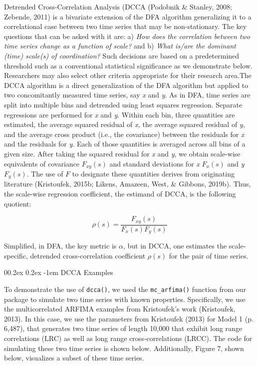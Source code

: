 \documentclass[
  man]{apa6}
\makeatletter
\let\oldparagraph\paragraph
\renewcommand{\paragraph}[1]{\oldparagraph{#1}\mbox{}}
\renewcommand{\paragraph}{\@startsection{paragraph}{4}{\parindent}%
  {0\baselineskip \@plus 0.2ex \@minus 0.2ex}%
  {-1em}%
  {\normalfont\normalsize\bfseries\itshape\typesectitle}}
\makeatother
\begin{document}
Detrended Cross-Correlation Analysis (DCCA
(Podobnik \& Stanley, 2008; Zebende, 2011) is a bivariate extension of
the DFA algorithm generalizing it to a correlational case between two
time series that may be non-stationary. The key questions that can be
asked with it are: a) \emph{How does the correlation between two time series
change as a function of scale?} and b) \emph{What is/are the dominant (time)
scale(s) of coordination?} Such decisions are based on a predetermined
threshold such as a conventional statistical significance as we
demonstrate below. Researchers may also select other criteria
appropriate for their research area.The DCCA algorithm is a direct
generalization of the DFA algorithm but applied to two concomitantly
measured time series, say \emph{x} and \emph{y}. As in DFA, time series are split
into multiple bins and detrended using least squares regression.
Separate regressions are performed for \emph{x} and \emph{y}. Within each bin,
three quantities are estimated, the average squared residual of \emph{x,} the
average squared residual of \emph{y}, and the average cross product (i.e.,
the covariance) between the residuals for \emph{x} and the residuals for \emph{y}.
Each of those quantities is averaged across all bins of a given size.
After taking the squared residual for \emph{x} and \emph{y}, we obtain scale-wise
equivalents of covariance \(F_{xy}(s)\) and standard deviations for \emph{x}
\(F_x(s)\) and \emph{y} \(F_y(s)\). The use of \(F\) to designate these quantities
derives from originating literature (Kristoufek, 2015b; Likens, Amazeen, West, \& Gibbons, 2019b).
Thus, the scale-wise regression coefficient, the estimand of DCCA, is
the following quotient:

\[\rho(s)=\frac{F_{xy}(s)}{F_x(s)F_y(s)}\]

Simplified, in DFA, the key metric is \(\alpha\), but in DCCA, one
estimates the scale-specific, detrended cross-correlation coefficient
\(\rho(s)\) for the pair of time series.

\hypertarget{dcca-examples}{%
\paragraph{DCCA Examples}\label{dcca-examples}}

To demonstrate the use of \texttt{dcca()}, we used the \texttt{mc\_arfima()} function
from our package to simulate two time series with known properties.
Specifically, we use the multicorrelated ARFIMA examples from
Kristoufek's work (Kristoufek, 2013). In
this case, we use the parameters from Kristoufek (2013) for Model 1 (p.
6,487), that generates two time series of length 10,000 that exhibit
long range correlations (LRC) as well as long range cross-correlations
(LRCC). The code for simulating these two time series is shown below.
Additionally, Figure 7, shown below, visualizes a subset of these time
series.
\end{document}
